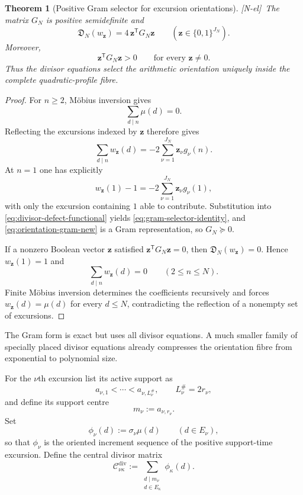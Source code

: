 \documentclass[11pt]{amsart}
\numberwithin{equation}{section}
\theoremstyle{plain}
\newtheorem{theorem}{Theorem}[section]
\theoremstyle{definition}
\theoremstyle{remark}
\newcommand{\tagNE}{\textup{[N-el]}}
\begin{document}
\begin{theorem}[Positive Gram selector for excursion orientations]
\label{thm:positive-gram-selector}
\tagNE\ The matrix $G_N$ is positive semidefinite and
\begin{equation}
\mathfrak D_N(w_\mathbf z)
=
4\,\mathbf z^{\mathsf T}G_N\mathbf z
\qquad
(\mathbf z\in\{0,1\}^{J_N}).
\label{eq:gram-selector-identity}
\end{equation}
Moreover,
\begin{equation}
\mathbf z^{\mathsf T}G_N\mathbf z>0
\qquad\text{for every }\mathbf z\ne0.
\label{eq:boolean-strict-positivity}
\end{equation}
Thus the divisor equations select the arithmetic orientation uniquely inside the complete quadratic-profile fibre.
\end{theorem}

\begin{proof}
For $n\ge2$, M\"obius inversion gives
\[
\sum_{d\mid n}\mu(d)=0.
\]
Reflecting the excursions indexed by $\mathbf z$ therefore gives
\[
\sum_{d\mid n}w_\mathbf z(d)
=-2\sum_{\nu=1}^{J_N}\mathbf z_\nu g_\nu(n).
\]
At $n=1$ one has explicitly
\[
w_\mathbf z(1)-1
=-2\sum_{\nu=1}^{J_N}\mathbf z_\nu g_\nu(1),
\]
with only the excursion containing $1$ able to contribute.  Substitution into \eqref{eq:divisor-defect-functional} yields \eqref{eq:gram-selector-identity}, and \eqref{eq:orientation-gram-new} is a Gram representation, so $G_N\succeq0$.

If a nonzero Boolean vector $\mathbf z$ satisfied $\mathbf z^{\mathsf T}G_N\mathbf z=0$, then $\mathfrak D_N(w_\mathbf z)=0$.  Hence $w_\mathbf z(1)=1$ and
\[
\sum_{d\mid n}w_\mathbf z(d)=0\qquad(2\le n\le N).
\]
Finite M\"obius inversion determines the coefficients recursively and forces $w_\mathbf z(d)=\mu(d)$ for every $d\le N$, contradicting the reflection of a nonempty set of excursions.
\end{proof}

The Gram form is exact but uses all divisor equations.  A much smaller family of specially placed divisor equations already compresses the orientation fibre from exponential to polynomial size.

For the $\nu$th excursion list its active support as
\[
a_{\nu,1}<\cdots<a_{\nu,L_\nu^\#},
\qquad L_\nu^\#=2r_\nu,
\]
and define its support centre
\[
m_\nu:=a_{\nu,r_\nu}.
\]
Set
\[
\phi_\nu(d):=\sigma_\nu\mu(d)
\qquad(d\in E_\nu),
\]
so that $\phi_\nu$ is the oriented increment sequence of the positive support-time excursion.  Define the central divisor matrix
\begin{equation}
\mathscr C^{\mathrm{div}}_{\nu\kappa}
:=
\sum_{\substack{d\mid m_\nu\\ d\in E_\kappa}}
\phi_\kappa(d).
\label{eq:central-divisor-matrix-new}
\end{equation}
\end{document}
